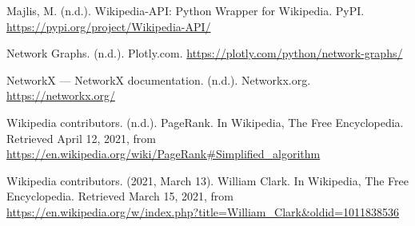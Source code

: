 \documentclass[fontsize=11pt]{article}
\begin{document}
\noindent Majlis, M. (n.d.). Wikipedia-API: Python Wrapper for Wikipedia. PyPI. \href{https://pypi.org/project/Wikipedia-API/}{https://pypi.org/project/Wikipedia-API/}

\noindent Network Graphs. (n.d.). Plotly.com. \href{https://plotly.com/python/network-graphs/}{https://plotly.com/python/network-graphs/}

\noindent NetworkX — NetworkX documentation. (n.d.). Networkx.org. \href{https://networkx.org/}{https://networkx.org/}

\noindent Wikipedia contributors. (n.d.). PageRank. In Wikipedia, The Free Encyclopedia. Retrieved April 12, 2021, from \href{https://en.wikipedia.org/wiki/PageRank\#Simplified\_algorithm}{https://en.wikipedia.org/wiki/PageRank\#Simplified\_algorithm}

\noindent Wikipedia contributors. (2021, March 13). William Clark. In Wikipedia, The Free Encyclopedia. Retrieved March 15, 2021, from \href{https://en.wikipedia.org/w/index.php?title=William_Clark&oldid=1011838536}{https://en.wikipedia.org/w/index.php?title=William\_Clark\&oldid=1011838536}
\end{document}
